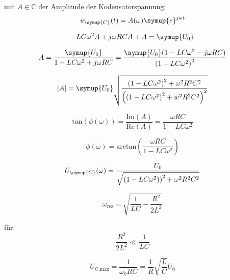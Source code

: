     mit $A \in  \mathds{C}$ der Amplitude der Kodensatorspannung:
    \begin{equation}
        u_{\symup{C}} (t) = A(\omega) \symup{e}^{j \omega t} \nonumber
    \end{equation}

    \begin{equation}
        -LC \omega^2 A + j\omega RC A +A = \symup{U_0} \nonumber
    \end{equation}

    \begin{equation}
        A= \frac{\symup{U_0}}{1 - LC \omega^2 + j \omega RC} = \frac{ \symup{U_0}(1 -LC \omega^2 - j\omega RC)}{\left( 1- LC \omega^2 \right)^2} \nonumber
    \end{equation}
    
    \begin{equation}
        |A|= \symup{U_0} \sqrt{\frac{\left(1-LC\omega^2\right)^2 + \omega^2 R^2C^2}{\left( \left(1 -LC \omega^2\right)^2 +w^2R^2C^2 \right)^2}} \nonumber
    \end{equation}

    \begin{equation}
        \text{tan}(\phi (\omega)) = \frac{\text{Im}(A)}{\text{Re}(A)} = \frac{\omega RC}{1 - LC\omega^2} \nonumber
    \end{equation}

    \begin{equation}
        \phi (\omega) = \text{arctan}\left(\frac{\omega RC}{1 - LC\omega^2} \right) \nonumber
    \end{equation}

    \begin{equation}
        U_{\symup{C}}(\omega) = \frac{U_0}{\sqrt{\left(1-LC\omega^2)\right)^2 + \omega^2 R^2 C^2}} \nonumber
    \end{equation}

    \begin{equation}
        \omega_{\text{res}} = \sqrt{\frac{1}{LC}-\frac{R^2}{2L^2}} \nonumber
    \end{equation}

    für: 
    \begin{equation}
        \frac{R^2}{2L^2} \ll \frac{1}{LC} \nonumber
    \end{equation}

    \begin{equation}
        U_{\text{C,max}} = \frac{1}{\omega_0 RC} = \frac{1}{R} \sqrt{\frac{L}{C}} U_0 \nonumber
    \end{equation}

